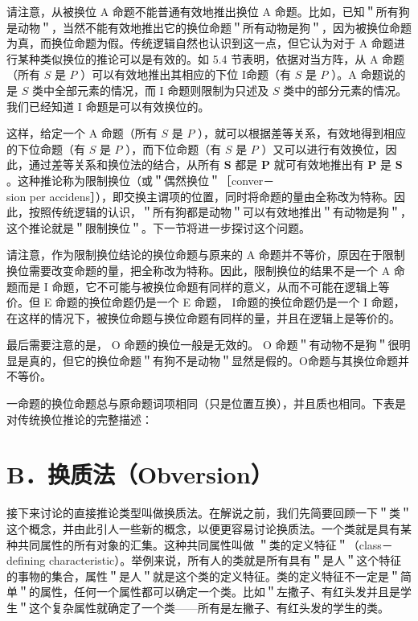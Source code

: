 请注意，从被换位 A 命题不能普通有效地推出换位 A 命题。比如，已知＂所有狗是动物＂，当然不能有效地推出它的换位命题＂所有动物是狗＂，因为被换位命题为真，而换位命题为假。传统逻辑自然也认识到这一点，但它认为对于 A 命题进行某种类似换位的推论可以是有效的。如 5.4 节表明，依据对当方阵，从 A 命题（所有 $S$ 是 $P$ ）可以有效地推出其相应的下位 I命题（有 $S$ 是 $P$ ）。A 命题说的是 $S$ 类中全部元素的情况，而 I 命题则限制为只述及 $S$ 类中的部分元素的情况。我们已经知道 I 命题是可以有效换位的。

这样，给定一个 A 命题（所有 $S$ 是 $P$ ），就可以根据差等关系，有效地得到相应的下位命题（有 $S$ 是 $P$ ），而下位命题（有 $S$ 是 $P$ ）又可以进行有效换位，因此，通过差等关系和换位法的结合，从所有 $\boldsymbol{S}$ 都是 $\boldsymbol{P}$ 就可有效地推出有 $\boldsymbol{P}$ 是 $\boldsymbol{S}$ 。这种推论称为限制换位（或＂偶然换位＂［conver－\\
sion per accidens］），即交换主谓项的位置，同时将命题的量由全称改为特称。因此，按照传统逻辑的认识，＂所有狗都是动物＂可以有效地推出＂有动物是狗＂，这个推论就是＂限制换位＂。下一节将进一步探讨这个问题。

请注意，作为限制换位结论的换位命题与原来的 A 命题并不等价，原因在于限制换位需要改变命题的量，把全称改为特称。因此，限制换位的结果不是一个 A 命题而是 I 命题，它不可能与被换位命题有同样的意义，从而不可能在逻辑上等价。但 E 命题的换位命题仍是一个 E 命题， I命题的换位命题仍是一个 I 命题，在这样的情况下，被换位命题与换位命题有同样的量，并且在逻辑上是等价的。

最后需要注意的是， O 命题的换位一般是无效的。 O 命题＂有动物不是狗＂很明显是真的，但它的换位命题＂有狗不是动物＂显然是假的。O命题与其换位命题并不等价。

一命题的换位命题总与原命题词项相同（只是位置互换），并且质也相同。下表是对传统换位推论的完整描述：

\section*{B．换质法（Obversion）}
接下来讨论的直接推论类型叫做换质法。在解说之前，我们先简要回顾一下＂类＂这个概念，并由此引人一些新的概念，以便更容易讨论换质法。一个类就是具有某种共同属性的所有对象的汇集。这种共同属性叫做 ＂类的定义特征＂（class－defining characteristic）。举例来说，所有人的类就是所有具有＂是人＂这个特征的事物的集合，属性＂是人＂就是这个类的定义特征。类的定义特征不一定是＂简单＂的属性，任何一个属性都可以确定一个类。比如＂左撒子、有红头发并且是学生＂这个复杂属性就确定了一个类——所有是左撇子、有红头发的学生的类。

